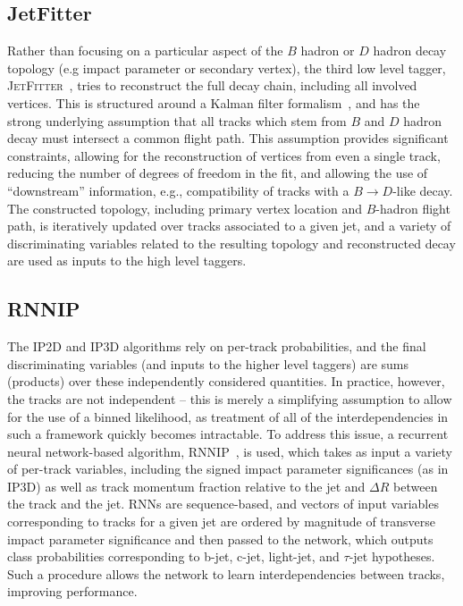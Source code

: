 \subsection{JetFitter}
Rather than focusing on a particular aspect of the $B$ hadron or $D$ hadron decay topology (e.g impact parameter 
or secondary vertex), the third low level tagger, \textsc{JetFitter}\xspace~\cite{ATL-PHYS-PUB-2018-025}, 
tries to reconstruct the full decay chain, including all involved vertices. This is structured around a 
Kalman filter formalism~\cite{Kalman}, and has the strong underlying assumption that all tracks which stem 
from $B$ and $D$ hadron decay must intersect a common flight path. This assumption provides significant constraints, 
allowing for the reconstruction of vertices from even a single track, reducing the number of degrees of 
freedom in the fit, and allowing the use of ``downstream'' information, e.g., compatibility of tracks with 
a $B\rightarrow D$-like decay. The constructed topology, including primary vertex location and $B$-hadron flight 
path, is iteratively updated over tracks associated to a given jet, and a variety of discriminating variables 
related to the resulting topology and reconstructed decay are used as inputs to the high level taggers.

\subsection{RNNIP}
The IP2D and IP3D algorithms rely on per-track probabilities, and the final discriminating variables (and inputs 
to the higher level taggers) are sums (products) over these independently considered quantities. In practice, 
however, the tracks are not independent -- this is merely a simplifying assumption to allow for the use of a 
binned likelihood, as treatment of all of the interdependencies in such a framework quickly becomes intractable. 
To address this issue, a recurrent neural network-based algorithm, RNNIP~\cite{ATL-PHYS-PUB-2017-003}, is used, 
which takes as input a variety of per-track variables, including the signed impact parameter significances (as in 
IP3D) as well as track momentum fraction relative to the jet and $\Delta R$ between the track and the jet. RNNs 
are sequence-based, and vectors of input variables corresponding to tracks for a given jet are ordered by magnitude of 
transverse impact parameter significance and then passed to the network, which outputs class probabilities corresponding 
to b-jet, c-jet, light-jet, and $\tau$-jet hypotheses. Such a procedure allows the network to learn interdependencies between tracks, improving performance.

